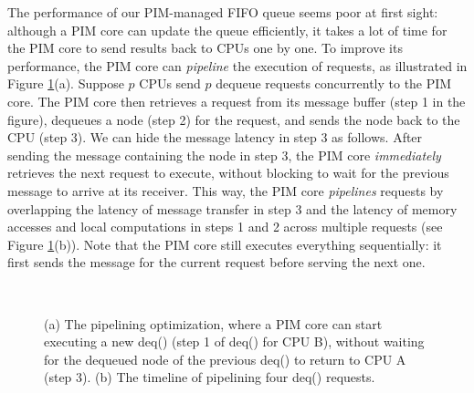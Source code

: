 The performance of our PIM-managed FIFO queue seems poor at first sight: although a PIM core can update 
the queue efficiently, it takes a lot of time for the PIM core to send results back to CPUs one by one. 
To improve its performance, the PIM core can \textit{pipeline} the execution of requests, 
as illustrated in Figure \ref{figure:queue_pipeline}(a). 
Suppose $p$ CPUs send $p$ dequeue requests concurrently to the PIM core. 
The PIM core then retrieves a request from its message buffer (step 1 in the figure), 
dequeues a node (step 2) for the request, and sends the node back to the CPU (step 3). 
We can hide the message latency in step 3 as follows. 
After sending the message containing the node in step 3, the PIM core \emph{immediately} retrieves the next 
request to execute, without blocking to wait for the previous message to arrive at its receiver. 
This way, the PIM core \emph{pipelines} requests by overlapping the latency of message transfer in step 3  
and the latency of memory accesses and local computations in steps 1 and 2 across multiple requests 
(see Figure \ref{figure:queue_pipeline}(b)). 
Note that the PIM core still executes everything sequentially: 
it first sends the message for the current request before serving the next one.

\begin{figure}[ht!]
\centering
{}
\\

\caption{(a) The pipelining optimization, where a PIM core can start executing 
a new deq() (step 1 of deq() for CPU B), without waiting for the dequeued node of 
the previous deq() to return to CPU A (step 3). 
(b) The timeline of pipelining four deq() requests.}
\label{figure:queue_pipeline}
\end{figure}
 
